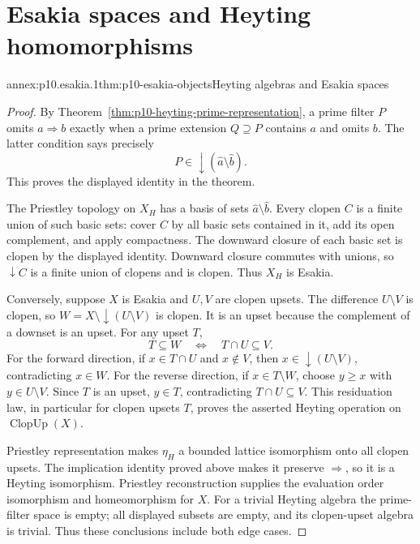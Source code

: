 
\section{Esakia spaces and Heyting homomorphisms}

\begin{annexitem}{annex:p10.esakia.1}{thm:p10-esakia-objects}{Heyting algebras and Esakia spaces}
\begin{proof}
By Theorem~\ref{thm:p10-heyting-prime-representation}, a prime filter
\(P\) omits \(a\Rightarrow b\) exactly when a prime extension
\(Q\supseteq P\) contains \(a\) and omits \(b\).
The latter condition says precisely
\[
 P\in\downarrow(\widehat a\setminus\widehat b).
\]
This proves the displayed identity in the theorem.

The Priestley topology on \(X_H\) has a basis of sets
\(\widehat a\setminus\widehat b\).
Every clopen \(C\) is a finite union of such basic sets:
cover \(C\) by all basic sets contained in it, add its open
complement, and apply compactness.
The downward closure of each basic set is clopen by the
displayed identity.
Downward closure commutes with unions, so \(\downarrow C\)
is a finite union of clopens and is clopen.
Thus \(X_H\) is Esakia.

Conversely, suppose \(X\) is Esakia and \(U,V\) are clopen upsets.
The difference \(U\setminus V\) is clopen, so
\(W=X\setminus\downarrow(U\setminus V)\) is clopen.
It is an upset because the complement of a downset is an upset.
For any upset \(T\),
\[
 T\subseteq W\quad\Longleftrightarrow\quad T\cap U\subseteq V.
\]
For the forward direction, if \(x\in T\cap U\) and \(x\notin V\),
then \(x\in\downarrow(U\setminus V)\), contradicting \(x\in W\).
For the reverse direction, if \(x\in T\setminus W\), choose
\(y\geq x\) with \(y\in U\setminus V\).
Since \(T\) is an upset, \(y\in T\), contradicting
\(T\cap U\subseteq V\).
This residuation law, in particular for clopen upsets \(T\),
proves the asserted Heyting operation on \(\operatorname{ClopUp}(X)\).

Priestley representation makes \(\eta_H\) a bounded lattice
isomorphism onto all clopen upsets.
The implication identity proved above makes it preserve
\(\Rightarrow\), so it is a Heyting isomorphism.
Priestley reconstruction supplies the evaluation order
isomorphism and homeomorphism for \(X\).
For a trivial Heyting algebra the prime-filter space is empty;
all displayed subsets are empty, and its clopen-upset algebra
is trivial. Thus these conclusions include both edge cases.
\end{proof}
\end{annexitem}


